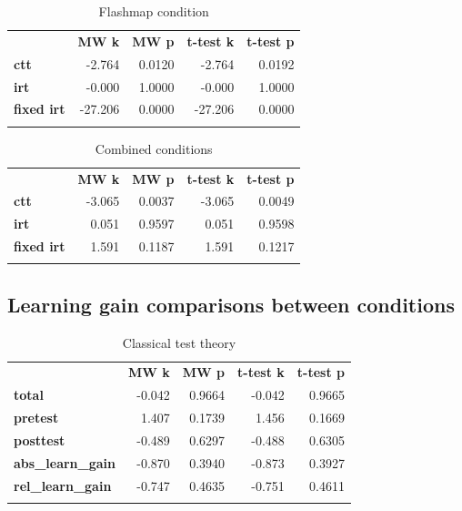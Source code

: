 \begin{longtable}[c]{@{}lrrrr@{}}
\caption{Flashmap condition}
\endfirsthead
\endhead
\toprule\addlinespace
& \textbf{MW k} & \textbf{MW p} &
\textbf{t-test k} & \textbf{t-test p}
\\\addlinespace
\midrule
\textbf{ctt} & -2.764 & 0.0120 & -2.764 & 0.0192
\\\addlinespace
\textbf{irt} & -0.000 & 1.0000 & -0.000 & 1.0000
\\\addlinespace
\textbf{fixed irt} & -27.206 & 0.0000 & -27.206 & 0.0000
\\\addlinespace
\bottomrule
    \label{tab:know_pp_fm_comp}
\end{longtable}

\begin{longtable}[c]{@{}lrrrr@{}}
\caption{Combined conditions}
\endfirsthead
\endhead
\toprule\addlinespace
& \textbf{MW k} & \textbf{MW p} &
\textbf{t-test k} & \textbf{t-test p}
\\\addlinespace
\midrule
\textbf{ctt} & -3.065 & 0.0037 & -3.065 & 0.0049
\\\addlinespace
\textbf{irt} & 0.051 & 0.9597 & 0.051 & 0.9598
\\\addlinespace
\textbf{fixed irt} & 1.591 & 0.1187 & 1.591 & 0.1217
\\\addlinespace
\bottomrule
    \label{tab:know_pp_gen_comp}
\end{longtable}

\FloatBarrier
\subsection{Learning gain comparisons between conditions}

\begin{longtable}[c]{@{}lrrrr@{}}
\caption{Classical test theory}
\endfirsthead
\endhead
\toprule\addlinespace
& \textbf{MW k} & \textbf{MW p} &
\textbf{t-test k} & \textbf{t-test p}
\\\addlinespace
\midrule
\textbf{total} & -0.042 & 0.9664 & -0.042 & 0.9665
\\\addlinespace
\textbf{pretest} & 1.407 & 0.1739 & 1.456 & 0.1669
\\\addlinespace
\textbf{posttest} & -0.489 & 0.6297 & -0.488 & 0.6305
\\\addlinespace
\textbf{abs\_learn\_gain} & -0.870 & 0.3940 & -0.873 & 0.3927
\\\addlinespace
\textbf{rel\_learn\_gain} & -0.747 & 0.4635 & -0.751 & 0.4611
\\\addlinespace
\bottomrule
    \label{tab:know_cond_ctt_comp}
\end{longtable}

